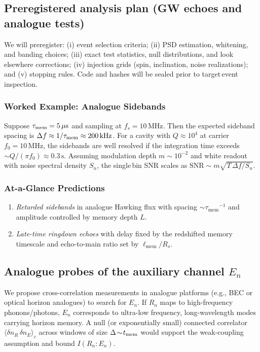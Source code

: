 \documentclass[11pt,a4paper]{article}
\newcommand{\ellmem}{\ensuremath{\ell_{\mathrm{mem}}}}
\newcommand{\taumem}{\ensuremath{\tau_{\mathrm{mem}}}}
\theoremstyle{plain}
\theoremstyle{definition}
\theoremstyle{remark}
\begin{document}
\subsection*{Preregistered analysis plan (GW echoes and analogue tests)}
We will preregister: (i) event selection criteria; (ii) PSD estimation, whitening, and banding choices; (iii) exact test statistics, null distributions, and look\,elsewhere corrections; (iv) injection grids (spin, inclination, noise realizations); and (v) stopping rules. Code and hashes will be sealed prior to target\,event inspection.

\subsubsection{Worked Example: Analogue Sidebands}
Suppose $\tau_{\rm mem}=5\,\mu\text{s}$ and sampling at $f_s=10\,\text{MHz}$. Then the expected sideband spacing is $\Delta f\approx 1/\tau_{\rm mem}\approx 200\,\text{kHz}$. For a cavity with $Q\approx 10^4$ at carrier $f_0=10\,\text{MHz}$, the sidebands are well resolved if the integration time exceeds $\sim Q/(\pi f_0)\approx 0.3\,\text{s}$. Assuming modulation depth $m\sim 10^{-2}$ and white readout with noise spectral density $S_n$, the single\,bin SNR scales as $\mathrm{SNR}\sim m \sqrt{T\,\Delta f / S_n}$.

% 
\subsubsection{At-a-Glance Predictions}
\begin{enumerate}
  \item \emph{Retarded sidebands} in analogue Hawking flux with spacing \(\sim \taumem^{-1}\) and amplitude controlled by memory depth \(L\).
  \item \emph{Late-time ringdown echoes} with delay fixed by the redshifted memory timescale and echo-to-main ratio set by \(\ellmem/R_s\).
\end{enumerate}

\subsection*{Analogue probes of the auxiliary channel $E_n$}
\label{sec:analogue-En}
We propose cross-correlation measurements in analogue platforms (e.g., BEC or optical horizon analogues) to search for $E_n$.
If $R_n$ maps to high-frequency phonons/photons, $E_n$ corresponds to ultra-low frequency, long-wavelength modes carrying horizon memory.
A null (or exponentially small) connected correlator $\langle \delta n_{R}\,\delta n_{E}\rangle_c$ across windows of size $\Delta\!\sim\!t_{\rm mem}$ would support the weak-coupling assumption and bound $I(R_n{:}E_n)$.
\end{document}
